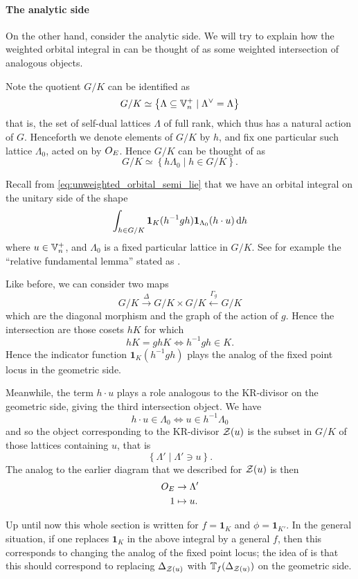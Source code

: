 \paragraph{The analytic side}
On the other hand, consider the analytic side.
We will try to explain how the weighted orbital integral in 
can be thought of as some weighted intersection of analogous objects.

Note the quotient $G/K$ can be identified as
\[ G/K \simeq \left\{ \Lambda \subseteq \mathbb V_n^+ \mid \Lambda^\vee = \Lambda \right\} \]
that is, the set of self-dual lattices $\Lambda$ of full rank,
which thus has a natural action of $G$.
Henceforth we denote elements of $G/K$ by $h$,
and fix one particular such lattice $\Lambda_0$, acted on by $O_E$.
Hence $G/K$ can be thought of as
\[ G/K \simeq \left\{ h \Lambda_0 \mid h \in G/K \right\}. \]

Recall from \eqref{eq:unweighted_orbital_semi_lie}
that we have an orbital integral on the unitary side of the shape
\[ \int_{h \in G/K} \mathbf{1}_K(h^{-1} g h) \mathbf{1}_{\Lambda_0}(h \cdot u) \odif h \]
where $u \in \mathbb V_n^+$, and $\Lambda_0$ is a fixed particular lattice in $G/K$.
See for example the ``relative fundamental lemma''
stated as \cite[Conjecture 1.9]{ref:liuFJ}.

Like before, we can consider two maps
\[ G/K \xrightarrow{\Delta} G/K \times G/K \xleftarrow{\Gamma_g} G/K \]
which are the diagonal morphism and the graph of the action of $g$.
Hence the intersection are those cosets $hK$ for which
\[ hK = ghK \iff h^{-1} g h \in K. \]
Hence the indicator function $\mathbf{1}_K(h^{-1} g h)$
plays the analog of the fixed point locus in the geometric side.

Meanwhile, the term $h \cdot u$ plays a role analogous
to the KR-divisor on the geometric side, giving the third intersection object.
We have
\[ h \cdot u \in \Lambda_0 \iff u \in h^{-1} \Lambda_0 \]
and so the object corresponding to the KR-divisor $\mathcal Z(u)$
is the subset in $G/K$ of those lattices containing $u$, that is
\[ \left\{ \Lambda' \mid \Lambda' \ni u \right\}. \]
The analog to the earlier diagram that we described for $\mathcal Z(u)$ is then
\begin{align*}
  O_E &\to \Lambda' \\
  1 &\mapsto u.
\end{align*}

Up until now this whole section is written for $f = \mathbf{1}_K$ and $\phi = \mathbf{1}_{K'}$.
In the general situation,
if one replaces $\mathbf{1}_K$ in the above integral by a general $f$,
then this corresponds to changing the analog of the fixed point locus;
the idea of \cite{ref:AFLspherical} is that
this should correspond to replacing $\Delta_{\mathcal Z(u)}$
with $\mathbb T_f(\Delta_{\mathcal Z(u)})$ on the geometric side.
